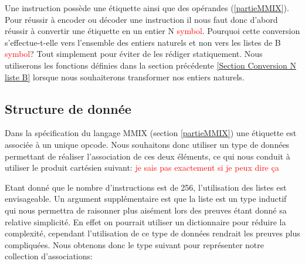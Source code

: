 \documentclass {article}
\newcommand{\codefrom}[3]
           {}
\theoremstyle{definition}
\theoremstyle{remark}
\newcommand{\todo}[1]{\textcolor{red}{#1}}
\begin{document}
Une instruction possède une étiquette ainsi que des opérandes (\ref{partieMMIX}).
Pour réussir à encoder ou décoder une instruction il nous faut donc d'abord
réussir à convertir une étiquette en un entier N \todo{symbol}.
Pourquoi cette conversion s'effectue-t-elle vers l'ensemble des entiers naturels
et non vers les listes de B \todo{symbol}? Tout simplement pour éviter
de les rédiger statiquement. Nous utiliserons les fonctions définies dans
la section précédente \ref{Section Conversion N liste B} lorsque nous souhaiterons transformer nos entiers naturels.

\subsection{Structure de donnée}
\label{Structure de donnee}
Dans la spécification du langage MMIX (section \ref{partieMMIX})
une étiquette est associée à un unique opcode. Nous souhaitons donc
utiliser un type de données permettant de réaliser l'association de ces deux éléments,
ce qui nous conduit à utiliser le produit cartésien suivant: \todo{je sais pas exactement si je peux dire ça}
\codefrom{src}{association_list}{assoc}

Etant donné que le nombre
d'instructions est de 256, l'utilisation des listes est envisageable.
Un argument supplémentaire est que la liste
est un type inductif qui nous permettra de raisonner plus aisément
lors des preuves étant donné sa relative simplicité. En effet on pourrait utiliser
un dictionnaire pour réduire la complexité, cependant l'utilisation de ce 
type de données rendrait les preuves plus compliquées.
Nous obtenons donc le type suivant pour représenter notre collection d'associations:

\codefrom{src}{association_list}{tag_opcode_assoc}


\end{document}
